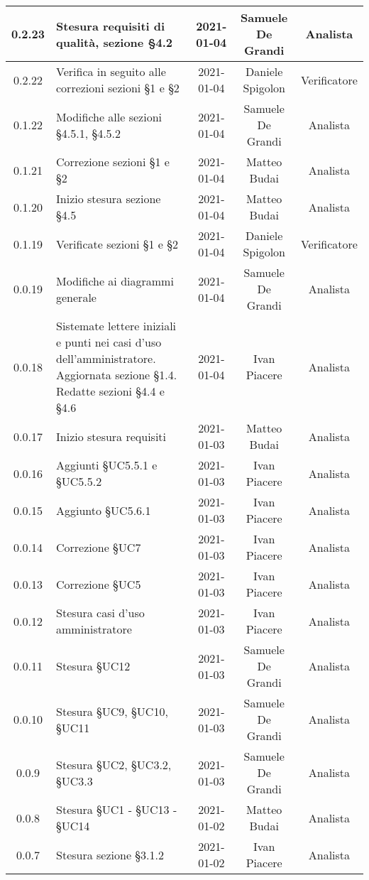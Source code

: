 \begin{center}
\begin{longtable}{|c|p{5cm}|c|c|c|}
		\hline
		0.2.23 & Stesura requisiti di qualità, sezione §4.2  & 2021-01-04 & Samuele De Grandi & Analista \\
		\hline
		0.2.22 & Verifica in seguito alle correzioni sezioni §1 e §2   & 2021-01-04 & Daniele Spigolon & Verificatore \\
		\hline
		0.1.22 & Modifiche alle sezioni §4.5.1, §4.5.2   & 2021-01-04 & Samuele De Grandi & Analista \\
		\hline
		0.1.21 & Correzione sezioni §1 e §2 & 2021-01-04 & Matteo Budai & Analista \\
		\hline
		0.1.20 & Inizio stesura sezione §4.5 & 2021-01-04 & Matteo Budai & Analista \\
		\hline
		0.1.19 & Verificate sezioni §1 e §2 & 2021-01-04 & Daniele Spigolon & Verificatore \\
		\hline
		0.0.19 & Modifiche ai diagrammi generale  & 2021-01-04 & Samuele De Grandi & Analista \\
		\hline
		0.0.18 & Sistemate lettere iniziali e punti nei casi d'uso dell'amministratore. Aggiornata sezione §1.4. Redatte sezioni §4.4 e §4.6 & 2021-01-04 & Ivan Piacere & Analista \\
		\hline
		0.0.17 & Inizio stesura requisiti & 2021-01-03 & Matteo Budai & Analista \\
		\hline
		0.0.16 & Aggiunti §UC5.5.1 e §UC5.5.2 & 2021-01-03 & Ivan Piacere & Analista \\
		\hline
		0.0.15 & Aggiunto §UC5.6.1 & 2021-01-03 & Ivan Piacere & Analista \\
		\hline
		0.0.14 & Correzione §UC7 & 2021-01-03 & Ivan Piacere & Analista \\
		\hline
		0.0.13 & Correzione §UC5 & 2021-01-03 & Ivan Piacere & Analista \\
		\hline
		0.0.12 & Stesura casi d'uso amministratore & 2021-01-03 & Ivan Piacere & Analista \\
		\hline
		0.0.11 & Stesura §UC12  & 2021-01-03 & Samuele De Grandi & Analista \\
		\hline
	    0.0.10 & Stesura §UC9, §UC10, §UC11  & 2021-01-03 & Samuele De Grandi & Analista \\
		\hline
		0.0.9 & Stesura §UC2, §UC3.2, §UC3.3  & 2021-01-03 & Samuele De Grandi & Analista \\
		\hline
		0.0.8 & Stesura §UC1 - §UC13 - §UC14 & 2021-01-02 & Matteo Budai & Analista \\
		\hline
		0.0.7 & Stesura sezione §3.1.2 & 2021-01-02 & Ivan Piacere & Analista\\

\end{longtable}
\end{center}
